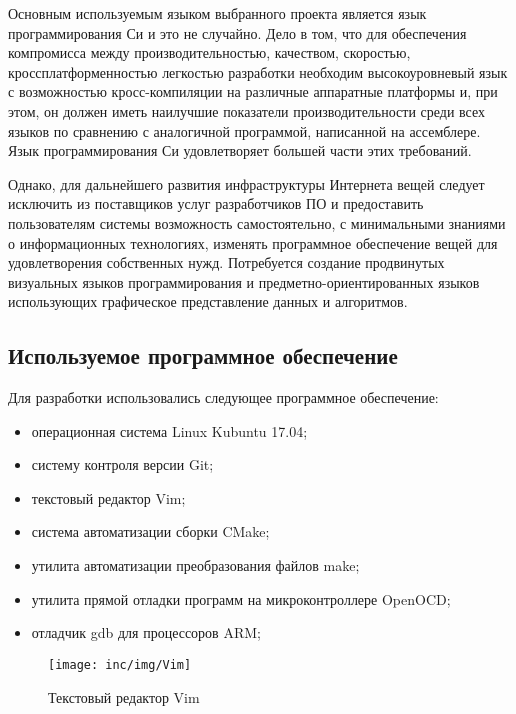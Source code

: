 Основным используемым языком выбранного проекта является язык программирования 
Си и это не случайно.
Дело в том, что для обеспечения компромисса между производительностью, 
качеством, скоростью, кроссплатформенностью легкостью разработки необходим 
высокоуровневый язык с возможностью кросс-компиляции на различные аппаратные 
платформы и, при этом, он должен иметь наилучшие показатели производительности 
среди всех языков по сравнению с аналогичной программой, написанной на 
ассемблере.
Язык программирования Си удовлетворяет большей части этих требований. 

Однако, для дальнейшего развития инфраструктуры Интернета вещей следует 
исключить из поставщиков услуг разработчиков ПО и предоставить пользователям 
системы возможность самостоятельно, с минимальными знаниями о информационных 
технологиях, изменять программное обеспечение вещей для удовлетворения 
собственных нужд.
Потребуется создание продвинутых визуальных языков программирования и 
предметно-ориентированных языков использующих графическое
представление данных и алгоритмов. 

\subsection{Используемое программное обеспечение}

Для разработки использовались следующее программное обеспечение:
\begin{itemize}
 \item операционная система Linux Kubuntu 17.04;
 \item систему контроля версии Git;
 \item текстовый редактор Vim;
 \item система автоматизации сборки CMake;
 \item утилита автоматизации преобразования файлов make;
 \item утилита прямой отладки программ на микроконтроллере OpenOCD;
 \item отладчик gdb для процессоров ARM;
\end{itemize}


\begin{figure}[!h]
  \centering
  \texttt{[image: inc/img/Vim]}
  \caption{Текстовый редактор Vim}
  \label{fig:ideeclipse}
\end{figure}


